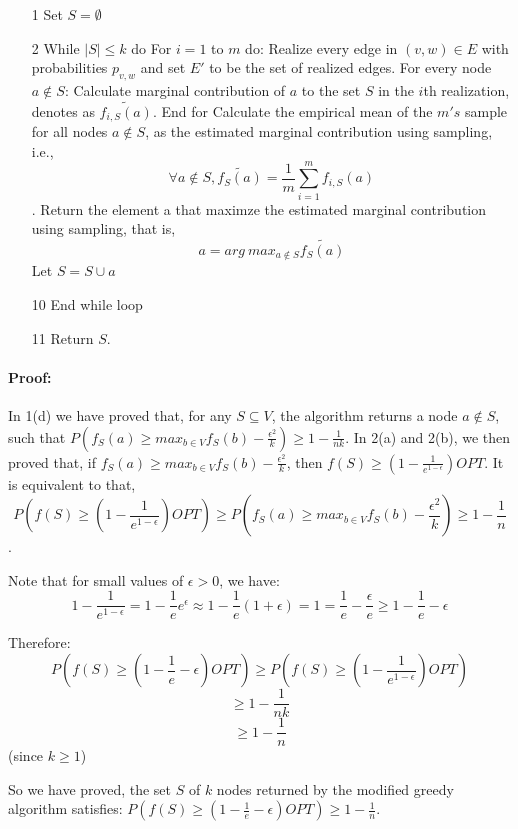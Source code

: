 \documentclass[11pt]{article} %
\begin{document}
\begin{itemize}
\item[1] Set $S=\emptyset$
\item[2] While $|S| \le k$ do
	\subitem[3]  For $i=1$ to $m$ do: 
		\subsubitem[4] Realize every edge in $(v,w) \in E$ with probabilities $p_{v,w} $ and set $E'$ to be the set of realized edges.
		\subsubitem[5] For every node $a \notin S$: Calculate marginal contribution of $a$ to the set $S$ in the $i$th realization, denotes as $\widetilde{f_{i,S}(a)}$.
	\subitem[6] End for
	\subitem[7] Calculate the empirical mean of the $m's$ sample for all nodes $a \notin S$, as the estimated marginal contribution using sampling, i.e., $$ \forall a \notin S,\widetilde{f_S(a)}=\frac{1}{m} \sum_{i=1}^{m} f_{i,S}(a)$$.
	\subitem[8]  Return the element a that maximze the estimated marginal contribution using sampling, that is, $$a= arg \ max _{a \notin S} \widetilde{f_{S}(a)}$$
	\subitem[9]  Let $S=S \cup a$
\item[10] End while loop
\item[11] Return $S$. 
\end{itemize}

\paragraph{\textbf{Proof:}} In 1(d) we have proved that, for any $S \subseteq V$, the algorithm returns a node $a \notin S$, such that $ P( f_S(a) \ge max_{b \in V} f_S(b) - \frac{\epsilon^2}{k} ) \ge 1-\frac{1}{n k}$. In 2(a) and 2(b), we then proved that, if $f_S(a) \ge max_{b \in V} f_S(b) - \frac{\epsilon^2}{k}$, then $f(S) \ge (1-\frac{1}{e^{1-\epsilon}} ) OPT$. It is equivalent to that, $$P(f(S) \ge (1-\frac{1}{e^{1-\epsilon}} ) OPT) \ge P(f_S(a) \ge max_{b \in V} f_S(b) - \frac{\epsilon^2}{k}) \ge 1-\frac{1}{n}$$. 

Note that for small values of $\epsilon >0$, we have: 
$$1-\frac{1}{e^{1-\epsilon}} =1-\frac{1}{e} e^{\epsilon} \approx 1-\frac{1}{e}(1+\epsilon)=1=\frac{1}{e}-\frac{\epsilon}{e} \ge 1-\frac{1}{e}-\epsilon $$

Therefore:
$$ P(f(S) \ge (1-\frac{1}{e}-\epsilon)OPT) \ge P(f(S) \ge (1-\frac{1}{e^{1-\epsilon}} ) OPT) $$
$$ \ge 1-\frac{1}{nk} $$
$$ \ge 1-\frac{1}{n} $$ (since $k \ge 1$) 
 
So we have proved, the set $S$ of $k$ nodes returned by the modified greedy algorithm satisfies: $P(f(S) \ge (1-\frac{1}{e}-\epsilon) OPT ) \ge 1-\frac{1}{n}$. 
\end{document}
